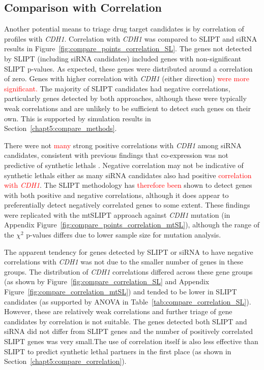 \subsection{Comparison with Correlation} \label{chapt3:compare_correlation} 

Another potential means to triage drug target candidates is by correlation of  profiles with \textit{CDH1}. Correlation with \textit{CDH1} was compared to \gls{SLIPT} and \gls{siRNA} results in Figure~\ref{fig:compare_points_correlation_SL}. The genes not detected by \gls{SLIPT} (including \gls{siRNA} candidates) included genes with non-significant \gls{SLIPT} p-values. As expected, these genes were distributed around a correlation of zero. Genes with higher correlation with \textit{CDH1} (either direction) \textcolor{red}{were more significant.} The majority of \gls{SLIPT} candidates had negative correlations, particularly genes detected by both approaches, although these were typically weak correlations and are unlikely to be sufficient to detect such genes on their own. This is supported by simulation results in Section~\ref{chapt5:compare_methods}.



There were not \textcolor{red}{many} strong positive correlations with \textit{CDH1} among \gls{siRNA} candidates, consistent with previous findings that co-expression was not predictive of \glspl{synthetic lethal} \citep{Jerby2014, Lu2015}. Negative correlation may not be indicative of \glspl{synthetic lethal} either as many \gls{siRNA} candidates also had positive \textcolor{red}{correlation with \textit{CDH1}}. The \gls{SLIPT} methodology has \textcolor{red}{therefore been} shown to detect genes with both positive and negative correlations, although it does appear to preferentially detect negatively correlated genes to some extent. These findings were replicated with the \acrshort{mtSLIPT} approach against \textit{CDH1} \gls{mutation} (in Appendix Figure~\ref{fig:compare_points_correlation_mtSL}), although the range of the $\chi^2$ p-values differs due to lower sample size for \gls{mutation} analysis.

\FloatBarrier

The apparent tendency for genes detected by \gls{SLIPT} or \gls{siRNA} to have negative correlations with \textit{CDH1}  was not due to the smaller number of genes in these groups. The distribution of \textit{CDH1} correlations differed across these gene groups (as shown by Figure~\ref{fig:compare_correlation_SL} and Appendix Figure~\ref{fig:compare_correlation_mtSL}) and tended to be lower in \gls{SLIPT} candidates (as supported by \gls{ANOVA} in Table~\ref{tab:compare_correlation_SL}). However, these are relatively weak correlations and further triage of gene candidates by correlation is not suitable. The genes detected both \gls{SLIPT} and \gls{siRNA} did not differ from \gls{SLIPT} genes and the number of positively correlated \gls{SLIPT} genes was very small.The use of correlation itself is also less effective than \gls{SLIPT} to predict \gls{synthetic lethal} partners in the first place (as shown in Section~\ref{chapt5:compare_correlation}).

